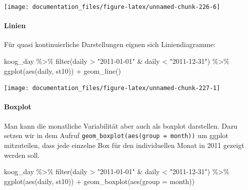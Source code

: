 \documentclass[
]{article}
\newenvironment{Shaded}{\begin{snugshade}}{\end{snugshade}}
\newcommand{\AttributeTok}[1]{\textcolor[rgb]{0.77,0.63,0.00}{#1}}
\newcommand{\FunctionTok}[1]{\textcolor[rgb]{0.00,0.00,0.00}{#1}}
\newcommand{\NormalTok}[1]{#1}
\newcommand{\SpecialCharTok}[1]{\textcolor[rgb]{0.00,0.00,0.00}{#1}}
\newcommand{\StringTok}[1]{\textcolor[rgb]{0.31,0.60,0.02}{#1}}
\begin{document}
\begin{center}\texttt{[image: documentation\_files/figure-latex/unnamed-chunk-226-6]} \end{center}

\hypertarget{linien}{%
\paragraph{Linien}\label{linien}}

Für quasi kontinuierliche Darstellungen eignen sich Liniendiagramme:

\begin{Shaded}
\begin{Highlighting}[]
\NormalTok{koog\_day }\SpecialCharTok{\%\textgreater{}\%}
  \FunctionTok{filter}\NormalTok{(daily }\SpecialCharTok{\textgreater{}} \StringTok{"2011{-}01{-}01"} \SpecialCharTok{\&}\NormalTok{ daily }\SpecialCharTok{\textless{}} \StringTok{"2011{-}12{-}31"}\NormalTok{) }\SpecialCharTok{\%\textgreater{}\%}
  \FunctionTok{ggplot}\NormalTok{(}\FunctionTok{aes}\NormalTok{(daily, st10)) }\SpecialCharTok{+}
  \FunctionTok{geom\_line}\NormalTok{()}
\end{Highlighting}
\end{Shaded}

\begin{center}\texttt{[image: documentation\_files/figure-latex/unnamed-chunk-227-1]} \end{center}

\hypertarget{boxplot}{%
\paragraph{Boxplot}\label{boxplot}}

Man kann die monatliche Variabilität aber auch als boxplot darstellen. Dazu setzen wir in dem Aufruf \texttt{geom\_boxplot(aes(group\ =\ month))} um ggplot mitzuteilen, dass jede einzelne Box für den individuellen Monat in 2011 gezeigt werden soll.

\begin{Shaded}
\begin{Highlighting}[]
\NormalTok{koog\_day }\SpecialCharTok{\%\textgreater{}\%}
  \FunctionTok{filter}\NormalTok{(daily }\SpecialCharTok{\textgreater{}} \StringTok{"2011{-}01{-}01"} \SpecialCharTok{\&}\NormalTok{ daily }\SpecialCharTok{\textless{}} \StringTok{"2011{-}12{-}31"}\NormalTok{) }\SpecialCharTok{\%\textgreater{}\%}
  \FunctionTok{ggplot}\NormalTok{(}\FunctionTok{aes}\NormalTok{(daily, st10)) }\SpecialCharTok{+}
  \FunctionTok{geom\_boxplot}\NormalTok{(}\FunctionTok{aes}\NormalTok{(}\AttributeTok{group =}\NormalTok{ month))}
\end{Highlighting}
\end{Shaded}
\end{document}
